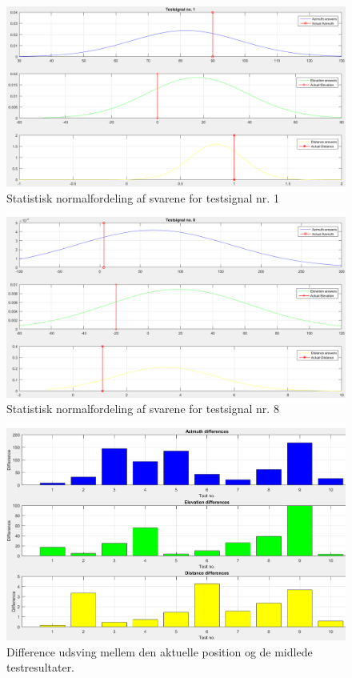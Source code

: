 \begin{figure}[h]
	\centering
	\includegraphics[width=1.1\linewidth]{All_Pics/test1stat}
	\caption{Statistisk normalfordeling af svarene for testsignal nr. 1}
	\label{fig:test1stat}
\end{figure}

\begin{figure}[h]
	\centering
	\includegraphics[width=1.1\linewidth]{All_Pics/test8stat}
	\caption{Statistisk normalfordeling af svarene for testsignal nr. 8}
	\label{fig:test8stat}
\end{figure}

\begin{figure}[h]
	\centering
	\includegraphics[width=1\linewidth]{All_Pics/resoverblikdiff}
	\caption{Difference udsving mellem den aktuelle position og de midlede testresultater.}
	\label{fig:resoverblikdiff}
\end{figure}






